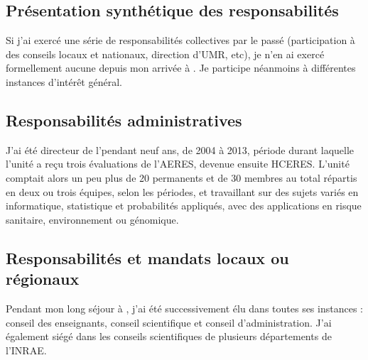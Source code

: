 \subsection{Présentation synthétique des responsabilités \todo{}}

Si j'ai exercé une série de responsabilités collectives par le passé (participation à des conseils locaux et nationaux, direction d’UMR, etc), je n’en ai exercé formellement aucune depuis mon arrivée à \SU. Je participe néanmoins à différentes instances d’intérêt général.

\subsection{Responsabilités administratives}
J’ai été directeur de l’\UMRlong pendant neuf ans, de 2004 à 2013, période durant laquelle l’unité a reçu trois évaluations de l’AERES, devenue ensuite HCERES. L’unité comptait alors un peu plus de 20 permanents et de 30 membres au total répartis en deux ou trois équipes, selon les périodes, et travaillant sur des sujets variés en informatique, statistique et probabilités appliqués, avec des applications en risque sanitaire, environnement ou génomique. 

\subsection{Responsabilités et mandats locaux ou régionaux}
Pendant mon long séjour à \APT, j’ai été successivement élu dans toutes ses instances : conseil des enseignants, conseil scientifique et conseil d’administration. J’ai également siégé dans les conseils scientifiques de plusieurs départements de l’INRAE.

